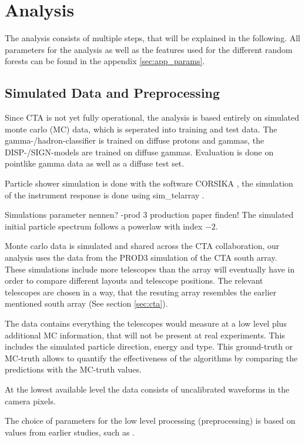 \chapter{Analysis}
\label{analysis}

The analysis consists of multiple steps, that will be explained in the following.
All parameters for the analysis as well as the features used for the
different random forests can be found in the appendix \ref{sec:app_params}.

\section{Simulated Data and Preprocessing}

Since CTA is not yet fully operational,
the analysis is based entirely on simulated monte carlo (MC) data,
which is seperated into training and test data.
The gamma-/hadron-classifier is trained on diffuse protons and gammas, 
the DISP-/SIGN-models are trained on diffuse gammas.
Evaluation is done on pointlike gamma data as well as a diffuse test set.

Particle shower simulation is done with the software CORSIKA \cite{heck1998corsika}, 
the simulation of the instrument response is done using sim\_telarray \cite{BERNLOHR2008149}.

Simulations parameter nennen? -prod 3 production paper finden!
The simulated initial particle spectrum follows a powerlaw with index $\num{-2}$.

Monte carlo data is simulated and shared across the CTA collaboration, 
our analysis uses the data from the PROD3 simulation of 
the CTA south array. These simulations include more telescopes 
than the array will eventually have in order to compare
different layouts and telescope positions.
The relevant telescopes are chosen in a way, that
the resuting array resembles the earlier mentioned south array (See section \ref{sec:cta}).

The data contains everything the telescopes would measure
at a low level
plus additional MC information, that will not be present at real experiments.
This includes the simulated particle direction, energy and type.
This ground-truth or MC-truth allows to quantify the effectiveness of the 
algorithms by comparing the predictions with the MC-truth values.

At the lowest available level the data consists of uncalibrated waveforms 
in the camera pixels.

The choice of parameters for the low level processing (preprocessing)
is based on values from earlier studies, such as \cite{kai_diss}.

